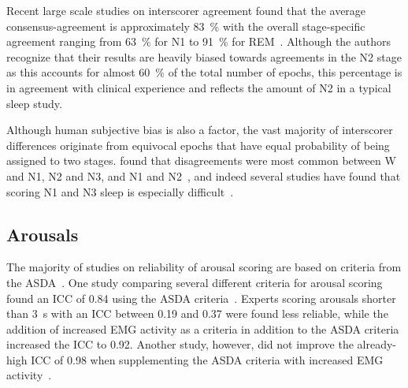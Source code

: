             Recent large scale studies on interscorer agreement found that the average consensus-agreement is approximately \SI{83}{\percent} with the overall stage-specific agreement ranging from \SI{63}{\percent} for \ac{N1} to \SI{91}{\percent} for REM~\cite{Rosenberg2013}.
            Although the authors recognize that their results are heavily biased towards agreements in the \ac{N2} stage as this accounts for almost \SI{60}{\percent} of the total number of epochs, this percentage is in agreement with clinical experience and reflects the amount of \ac{N2} in a typical sleep study.
            
            Although human subjective bias is also a factor, the vast majority of interscorer differences originate from equivocal epochs that have equal probability of being assigned to two stages. 
            \citeauthor{Younes2016} found that disagreements were most common between \ac{W} and \ac{N1}, \ac{N2} and \ac{N3}, and \ac{N1} and \ac{N2}~\cite{Younes2016}, and indeed several studies have found that scoring \ac{N1} and \ac{N3} sleep is especially difficult~\cite{Danker-Hopfe2004,Rosenberg2013,Zhang2015a,Younes2018}.
            
        
        \subsection{Arousals}\label{sec:challenges-arousals}
        
            The majority of studies on reliability of arousal scoring are based on criteria from the \ac{ASDA}~\cite{Bonnet2007}.
            One study comparing several different criteria for arousal scoring found an \ac{ICC} of 0.84 using the \ac{ASDA} criteria~\cite{Loredo1999}. 
            Experts scoring arousals shorter than \SI{3}{\second} with an \ac{ICC} between 0.19 and 0.37 were found less reliable, while the addition of increased \ac{EMG} activity as a criteria in addition to the \ac{ASDA} criteria increased the \ac{ICC} to 0.92.
            Another study, however, did not improve the already-high \ac{ICC} of 0.98 when supplementing the \ac{ASDA} criteria with increased \ac{EMG} activity~\cite{Smurra2001}.
            

